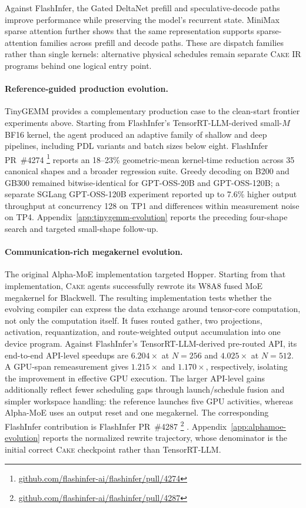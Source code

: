 \documentclass[11pt]{article}
\newcommand{\cake}{\textsc{Cake}}
\newcommand{\cakeir}{\textsc{Cake IR}}
\newcommand{\flashinferpr}[1]{%
  FlashInfer PR~\##1%
  \footnote{\href{https://github.com/flashinfer-ai/flashinfer/pull/#1}%
    {github.com/flashinfer-ai/flashinfer/pull/#1}}%
}
\begin{document}
Against FlashInfer, the Gated DeltaNet prefill and speculative-decode paths
improve performance while preserving the model's recurrent state. MiniMax
sparse attention further shows that the same representation supports
sparse-attention families across prefill and decode paths. These are dispatch
families rather than single kernels: alternative physical schedules remain
separate \cakeir{} programs behind one logical entry point.

\paragraph{Reference-guided production evolution.}
TinyGEMM provides a complementary production case to the clean-start frontier
experiments above. Starting from FlashInfer's TensorRT-LLM-derived small-$M$
BF16 kernel, the agent produced an adaptive family of shallow and deep
pipelines, including PDL variants and batch sizes below eight.
\flashinferpr{4274} reports an 18--23\% geometric-mean kernel-time reduction
across 35 canonical shapes and a broader regression suite.
Greedy decoding on B200 and GB300 remained bitwise-identical for GPT-OSS-20B
and GPT-OSS-120B; a separate SGLang GPT-OSS-120B experiment reported up to
7.6\% higher output throughput at concurrency 128 on TP1 and differences
within measurement noise on TP4. Appendix~\ref{app:tinygemm-evolution} reports the preceding four-shape search
and targeted small-shape follow-up.

\paragraph{Communication-rich megakernel evolution.}
The original Alpha-MoE implementation \cite{alpha_moe2025} targeted Hopper.
Starting from that implementation, \cake{} agents successfully rewrote its W8A8
fused MoE megakernel for Blackwell. The resulting implementation tests whether
the evolving compiler can express the data exchange around tensor-core
computation, not only the computation itself. It fuses routed gather, two
projections, activation, requantization, and route-weighted output accumulation
into one device program.
Against FlashInfer's TensorRT-LLM-derived pre-routed API, its end-to-end
API-level speedups are $6.204\times$ at $N{=}256$ and $4.025\times$ at
$N{=}512$. A GPU-span remeasurement gives $1.215\times$ and $1.170\times$,
respectively, isolating the improvement in effective GPU execution. The larger
API-level gains additionally reflect fewer scheduling gaps through
launch/schedule fusion and simpler workspace handling: the reference launches
five GPU activities, whereas Alpha-MoE uses an output reset and one megakernel.
The corresponding FlashInfer contribution is \flashinferpr{4287}.
Appendix~\ref{app:alphamoe-evolution} reports the normalized rewrite trajectory,
whose denominator is the initial correct \cake{} checkpoint rather than
TensorRT-LLM.
\end{document}
